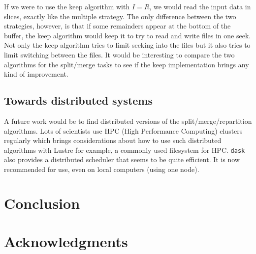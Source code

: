 \documentclass[conference]{IEEEtran}
\begin{document}
If we were to use the keep algorithm with $I=R$, we would read the input data
in slices, exactly like the multiple strategy. The only difference between the
two strategies, however, is that if some remainders appear at the bottom of the
buffer, the keep algorithm would keep it to try to read and write files in one
seek. Not only the keep algorithm tries to limit seeking into the files but it
also tries to limit switching between the files. It would be interesting to
compare the two algorithms for the split/merge tasks to see if the keep
implementation brings any kind of improvement.

\subsection{Towards distributed systems}
A future work would be to find distributed versions of the split/merge/repartition
algorithms. Lots of scientists use HPC (High Performance Computing) clusters
regularly which brings considerations about how to use such distributed
algorithms with Lustre for example, a commonly used filesystem for HPC. \texttt{dask}
also provides a distributed scheduler that seems to be quite efficient. It is
now recommended for use, even on local computers (using one node).

\section{Conclusion}

\section{Acknowledgments}



\end{document}
